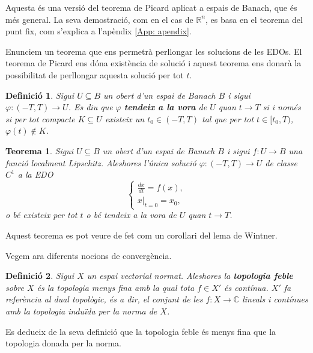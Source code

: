 \documentclass{article}
\numberwithin{equation}{section}
\newtheorem{teorema}{Teorema}[section]
\newtheorem{definicio}{Definici\'{o}}[section]
\begin{document}
Aquesta \'{e}s una versi\'{o} del teorema de Picard aplicat a espais de Banach, que \'{e}s m\'{e}s general. La seva demostraci\'{o}, com en el cas de $\mathbb{R}^n$, es basa en el teorema del punt fix, com s'explica a l'ap\`{e}ndix \ref{App: apendix}.

Enunciem un teorema que ens permetr\`{a} perllongar les solucions de les EDOs. El teorema de Picard ens d\'{o}na exist\`{e}ncia de soluci\'{o} i aquest teorema ens donar\`{a} la possibilitat de perllongar aquesta soluci\'{o} per tot $t$.

\begin{definicio}
Sigui $U\subseteq B$ un obert d'un espai de Banach $B$ i sigui $\varphi:(-T,T)\rightarrow U$. Es diu que $\varphi$ \textbf{tendeix a la vora} de $U$ quan $t\to T$ si i nom\'{e}s si per tot compacte $K\subseteq U$ existeix un $t_0\in(-T,T)$ tal que per tot $t\in[t_0,T)$, $\varphi(t)\notin K$.
\end{definicio}

\begin{teorema}\label{Teo: Wintner}
Sigui $U\subseteq B$ un obert d'un espai de Banach $B$ i sigui $f:U\rightarrow B$ una funci\'{o} localment Lipschitz. Aleshores l'\'{u}nica soluci\'{o} $\varphi:(-T,T)\rightarrow U$ de classe $C^1$ a la EDO
\[\left\{\begin{array}{l}\displaystyle{\frac{dx}{dt}=f(x),}\\x|_{t=0}=x_0,\end{array}\right.\]
o b\'{e} existeix per tot $t$ o b\'{e} tendeix a la vora de $U$ quan $t\to T$.
\end{teorema}

Aquest teorema es pot veure de fet com un corol\textperiodcentered lari del lema de Wintner.
\vspace{3mm}

Vegem ara diferents nocions de converg\`{e}ncia.

\begin{definicio}
Sigui $X$ un espai vectorial normat. Aleshores la \textbf{topologia feble} sobre $X$ \'{e}s la topologia menys fina amb la qual tota $f\in X'$ \'{e}s cont\'{i}nua. $X'$ fa refer\`{e}ncia al dual topol\`{o}gic, \'{e}s a dir, el conjunt de les $f:X\rightarrow\mathbb{C}$ lineals i cont\'{i}nues amb la topologia indu\"{i}da per la norma de $X$.
\end{definicio}

Es dedueix de la seva definici\'{o} que la topologia feble \'{e}s menys fina que la topologia donada per la norma.
\end{document}
